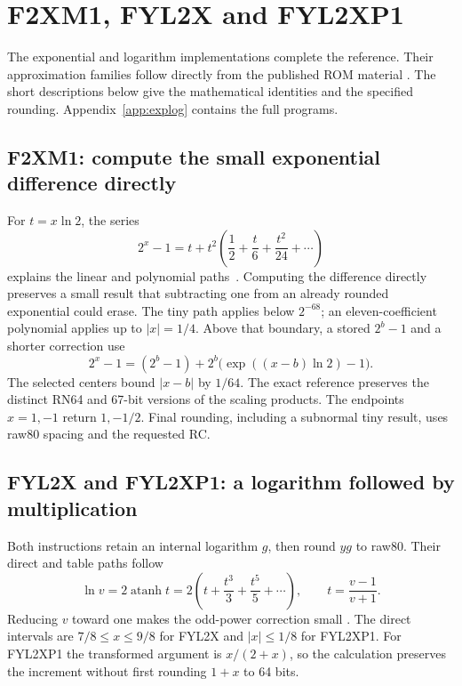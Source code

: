 \documentclass[11pt]{article}
\begin{document}
\clearpage
\section{F2XM1, FYL2X and FYL2XP1}
\label{family:explog}

The exponential and logarithm implementations complete the reference.
Their approximation families follow directly from the published ROM material
\cite{shirriff2025rom}.
The short descriptions below give the mathematical identities and the
specified rounding. Appendix~\ref{app:explog} contains the full programs.

\subsection{F2XM1: compute the small exponential difference directly}
\label{sec:exp}

For $t=x\ln2$, the series
\begin{equation}
 2^x-1=t+t^2\left(\frac12+\frac{t}{6}+\frac{t^2}{24}+\cdots\right)
\end{equation}
explains the linear and polynomial paths~\cite[Section~4.2]{dlmfElementary}.
Computing the difference directly preserves a small result that subtracting
one from an already rounded exponential could erase. The tiny path applies
below $2^{-68}$; an eleven-coefficient polynomial applies up to $|x|=1/4$.
Above that boundary, a stored $2^b-1$ and a shorter correction use
\begin{equation}
 2^x-1=(2^b-1)+2^b\bigl(\exp((x-b)\ln2)-1\bigr).
\end{equation}
The selected centers bound $|x-b|$ by $1/64$. The exact reference preserves
the distinct RN64 and 67-bit versions of the scaling products. The endpoints
$x=1,-1$ return $1,-1/2$. Final rounding, including a subnormal tiny result,
uses raw80 spacing and the requested RC.

\subsection{FYL2X and FYL2XP1: a logarithm followed by multiplication}
\label{sec:log}

Both instructions retain an internal logarithm $g$, then round $yg$ to
raw80. Their direct and table paths follow
\begin{equation}
 \ln v=2\operatorname{atanh}t
       =2\left(t+\frac{t^3}{3}+\frac{t^5}{5}+\cdots\right),
 \qquad t=\frac{v-1}{v+1}.
\end{equation}
Reducing $v$ toward one makes the odd-power correction small
\cite[Section~4.6]{dlmfElementary}. The direct intervals are
$7/8\leq x\leq9/8$ for FYL2X and $|x|\leq1/8$ for FYL2XP1.
For FYL2XP1 the transformed argument is $x/(2+x)$, so the calculation
preserves the increment without first rounding $1+x$ to 64 bits.
\end{document}
